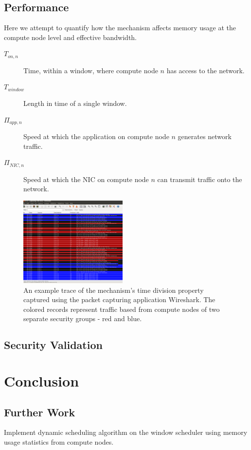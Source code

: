 \documentclass{llncs}
\begin{document}
\subsection{Performance}
Here we attempt to quantify how the mechanism affects memory usage at the compute node level and effective bandwidth.
\begin{description}
    \item[$T_{on, n}$] Time, within a window, where compute node $n$ has access to the network.
    \item[$T_{window}$] Length in time of a single window.
    \item[$\Pi_{app, n}$] Speed at which the application on compute node $n$ generates network traffic.
    \item[$\Pi_{NIC, n}$] Speed at which the NIC on compute node $n$ can transmit traffic onto the network.
    
    
\end{description} 
\begin{figure}
 \vspace{-25pt}
  \begin{center}
    \includegraphics[width=0.48\textwidth]{wireshark.jpg}
  \end{center}
  \caption{An example trace of the mechanism's time division property captured using the packet capturing application Wireshark. The colored records represent traffic based from compute nodes of two separate security groups - red and blue.}
\label{fig:wireshark}
\vspace{-25pt}
\end{figure}

\subsection{Security Validation}
\section{Conclusion}
\subsection{Further Work}
Implement dynamic scheduling algorithm on the window scheduler using memory usage statistics from compute nodes. 



\end{document}
